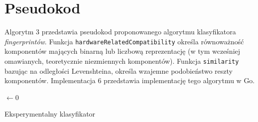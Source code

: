 

\section{Pseudokod}
Algorytm 3 przedstawia pseudokod proponowanego algorytmu klasyfikatora
\emph{fingerprintów}. Funkcja \texttt{hardwareRelatedCompatibility} określa
równoważność komponentów mających binarną lub liczbową reprezentację (w tym
wcześniej omawianych, teoretycznie niezmiennych komponentów). Funkcja
\texttt{similarity} bazując na odległości Levenshteina, określa wzajemne
podobieństwo reszty komponentów. Implementacja 6 przedstawia implementację tego
algorytmu w Go.


\begin{algorithm}
	\SetAlgoVlined
	\BlankLine
	\BlankLine
	\VarMax $\leftarrow 0$\;
	\ForEach{\VarG $\in$ \SetG}{
		\If{\HardwareRelatedCompatibility{\VarF, \VarG} $< \alpha$}{
			\Continue\;
		}
		\BlankLine
		\VarRatio $\leftarrow$ \Similarity{\VarF, \VarG}\;
		\BlankLine
		\If{\VarRatio $>$ \VarMax}{
			\VarMax $\leftarrow$ \VarRatio\;
			\VarCandidate $\leftarrow$ \VarG\;
		}
	}
	\If{\VarMax $\ge \beta$}{
		\Return{\VarCandidate}\;
	}
	\Return{\Null}\;
	\caption{Eksperymentalny klasyfikator}
\end{algorithm}



